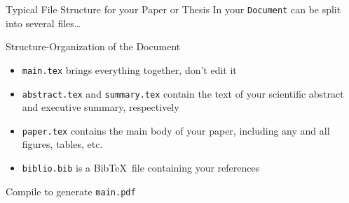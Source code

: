 



\begin{frame}{Typical File Structure for your Paper or Thesis}
In your \texttt{Document} can be split into several files\ldots
\begin{block}{Structure-Organization of the Document}
\begin{itemize}
\item \texttt{main.tex} brings everything together, don't edit it
\item \texttt{abstract.tex} and \texttt{summary.tex} contain the text of your scientific abstract and executive summary, respectively
\item \texttt{paper.tex} contains the main body of your paper, including any and all figures, tables, etc.
\item \texttt{biblio.bib} is a Bib\TeX~file containing your references
\end{itemize}
\end{block}
Compile to generate \texttt{main.pdf}
\end{frame}

